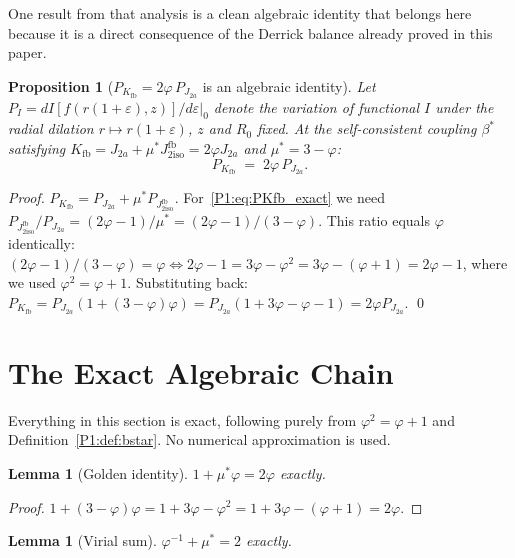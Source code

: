 \documentclass[11pt,a4paper]{article}
\newtheorem{lemma}[theorem]{Lemma}
\newtheorem{proposition}[theorem]{Proposition}
\theoremstyle{definition}
\theoremstyle{remark}
\newcommand{\vp}{\varphi}
\newcommand{\ms}{\mu^{*}}
\newcommand{\bst}{\beta^{*}}
\newcommand{\Kfb}{K_{\mathrm{fb}}}
\newcommand{\Jfb}{J_{2\mathrm{iso}}^{\mathrm{fb}}}
\newcommand{\Ja}{J_{2a}}
\begin{document}
One result from that analysis is a clean algebraic identity that
belongs here because it is a direct consequence of the Derrick balance
already proved in this paper.

\begin{proposition}[$P_{\Kfb} = 2\vp\,P_{\Ja}$ is an algebraic identity]
\label{P1:prop:PKfb}
Let $P_I = d I[f(r(1+\varepsilon),z)]/d\varepsilon|_0$ denote the
variation of functional $I$ under the radial dilation
$r\mapsto r(1+\varepsilon)$, $z$ and $R_0$ fixed.
At the self-consistent coupling $\bst$ satisfying
$\Kfb = \Ja + \ms\Jfb = 2\vp\Ja$ and $\ms = 3-\vp$:
\begin{equation}
  P_{\Kfb} \;=\; 2\vp\,P_{\Ja}.
  \label{P1:eq:PKfb_exact}
\end{equation}
\end{proposition}

\begin{proof}
$P_{\Kfb} = P_{\Ja} + \ms P_{\Jfb}$.
For~\eqref{P1:eq:PKfb_exact} we need $P_{\Jfb}/P_{\Ja} = (2\vp-1)/\ms
= (2\vp-1)/(3-\vp)$.
This ratio equals $\vp$ identically:
$(2\vp-1)/(3-\vp)=\vp \Leftrightarrow 2\vp-1=3\vp-\vp^2=3\vp-(\vp+1)=2\vp-1$,
where we used $\vp^2=\vp+1$.
Substituting back: $P_{\Kfb}=P_{\Ja}(1+(3-\vp)\vp)=P_{\Ja}(1+3\vp-\vp-1)=2\vp P_{\Ja}$.
\qed
\end{proof}

\newpage
\section{The Exact Algebraic Chain}
\label{P1:sec:algebra}

Everything in this section is exact, following purely from
$\vp^{2}=\vp+1$ and Definition~\ref{P1:def:bstar}.  No numerical
approximation is used.

\begin{lemma}[Golden identity]
\label{P1:lem:golden}
$1 + \ms\vp = 2\vp$ exactly.
\end{lemma}

\begin{proof}
$1 + (3-\vp)\vp = 1 + 3\vp - \vp^{2} = 1 + 3\vp - (\vp+1) = 2\vp$.
\end{proof}

\begin{lemma}[Virial sum]
\label{P1:lem:virial}
$\vp^{-1} + \ms = 2$ exactly.
\end{lemma}
\end{document}
